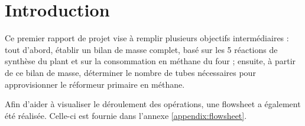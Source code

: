 \section{Introduction}

Ce premier rapport de projet vise à remplir plusieurs objectifs intermédiaires : tout d'abord, établir un bilan de masse complet, basé sur les 5 réactions de synthèse du plant et sur la consommation en méthane du four ; ensuite, à partir de ce bilan de masse, déterminer le nombre de tubes nécessaires pour approvisionner le réformeur primaire en méthane.

Afin d'aider à visualiser le déroulement des opérations, une flowsheet a également été réalisée. Celle-ci est fournie dans l'annexe \ref{appendix:flowsheet}.
